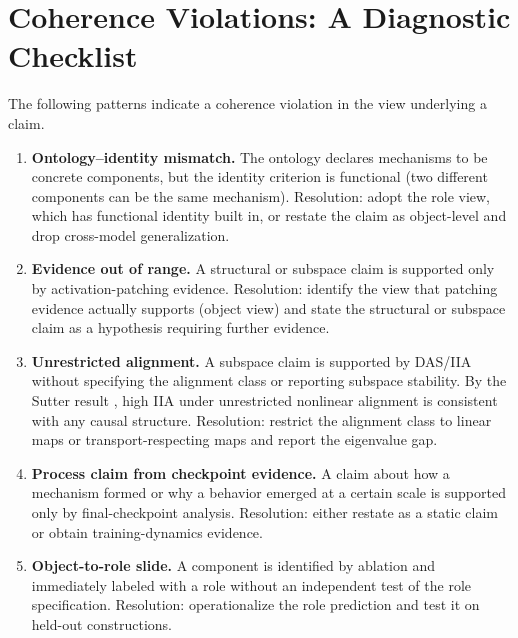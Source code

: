\documentclass[11pt]{article}
\theoremstyle{remark}
\begin{document}
\newpage
\appendix
\section{Coherence Violations: A Diagnostic Checklist}\label{app:checklist}

The following patterns indicate a coherence violation in the view
underlying a claim.

\begin{enumerate}[leftmargin=*, label=(\arabic*)]

\item \textbf{Ontology--identity mismatch.}  The ontology declares
      mechanisms to be concrete components, but the identity criterion is
      functional (two different components can be the same mechanism).
      Resolution: adopt the role view, which has functional identity built
      in, or restate the claim as object-level and drop cross-model
      generalization.

\item \textbf{Evidence out of range.}  A structural or subspace claim
      is supported only by activation-patching evidence.  Resolution:
      identify the view that patching evidence actually supports (object
      view) and state the structural or subspace claim as a hypothesis
      requiring further evidence.

\item \textbf{Unrestricted alignment.}  A subspace claim is supported
      by DAS/IIA without specifying the alignment class or reporting
      subspace stability.  By the Sutter result \citep{sutter2025}, high
      IIA under unrestricted nonlinear alignment is consistent with any
      causal structure.  Resolution: restrict the alignment class to
      linear maps or transport-respecting maps and report the eigenvalue gap.

\item \textbf{Process claim from checkpoint evidence.}  A claim about
      how a mechanism formed or why a behavior emerged at a certain scale
      is supported only by final-checkpoint analysis.  Resolution: either
      restate as a static claim or obtain training-dynamics evidence.

\item \textbf{Object-to-role slide.}  A component is identified by
      ablation and immediately labeled with a role without an independent
      test of the role specification.  Resolution: operationalize the role
      prediction and test it on held-out constructions.

\end{enumerate}
\end{document}
